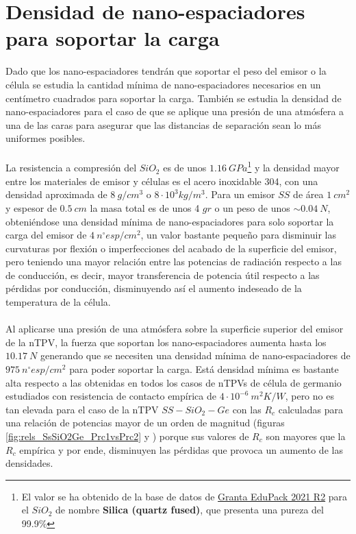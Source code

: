 \section{Densidad de nano-espaciadores para soportar la carga}\label{sec:densidad_carga}
Dado que los nano-espaciadores tendrán que soportar el peso del emisor o la célula se estudia la cantidad mínima de nano-espaciadores necesarios en un centímetro cuadrados para soportar la carga. También se estudia la densidad de nano-espaciadores para el caso de que se aplique una presión de una atmósfera a una de las caras para asegurar que las distancias de separación sean lo más uniformes posibles.\\\\
La resistencia a compresión del $SiO_2$ es de unos $1.16 \ GPa$\footnote{El valor se ha obtenido de la base de datos de \hyperref[sec:grantaEduPack]{Granta EduPack 2021 R2} para el $SiO_2$ de nombre \textbf{Silica (quartz fused)}, que presenta una pureza del 99.9\%} y la densidad mayor entre los materiales de emisor y células es el acero inoxidable 304, con una densidad aproximada de $8 \ g/cm^3$ o $8\cdot 10^3 kg/m^3$. Para un emisor $SS$ de área $1 \ cm^2$ y espesor de $0.5 \ cm$ la masa total es de unos 4 $gr$ o un peso de unos $\sim 0.04 \ N$, obteniéndose una densidad mínima de nano-espaciadores para solo soportar la carga del emisor de $4 \ n^{\circ}esp/cm^2$, un valor bastante pequeño para disminuir las curvaturas por flexión o imperfecciones del acabado de la superficie del emisor, pero teniendo una mayor relación entre las potencias de radiación respecto a las de conducción, es decir, mayor transferencia de potencia útil respecto a las pérdidas por conducción, disminuyendo así el aumento indeseado de la temperatura de la célula.\\\\
Al aplicarse una presión de una atmósfera sobre la superficie superior del emisor de la nTPV, la fuerza que soportan los nano-espaciadores aumenta hasta los $10.17 \ N$ generando que se necesiten una densidad mínima de nano-espaciadores de $975 \ n^{\circ}esp/cm^2$ para poder soportar la carga. Está densidad mínima es bastante alta respecto a las obtenidas en todos los casos de nTPVs de célula de germanio estudiados con resistencia de contacto empírica de $4\cdot 10^{-6} \ m^2 K/W$, pero no es tan elevada para el caso de la nTPV $SS-SiO_2-Ge$ con las $R_c$ calculadas para una relación de potencias mayor de un orden de magnitud (figuras \ref{fig:rels_SsSiO2Ge_Prc1vsPrc2}  y ) porque sus valores de $R_c$ son mayores que la $R_c$ empírica y por ende, disminuyen las pérdidas que provoca un aumento de las densidades.
\vfill \newpage
